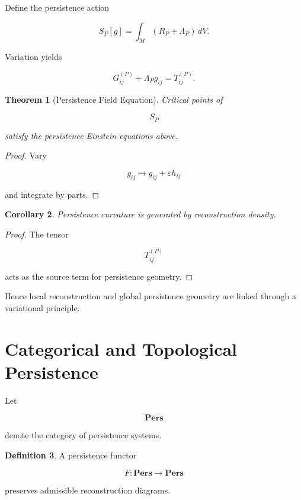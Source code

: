 \documentclass[12pt,oneside]{article}
\newtheorem{theorem}{Theorem}[section] \newtheorem{lemma}[theorem]{Lemma} \newtheorem{proposition}[theorem]{Proposition} \newtheorem{corollary}[theorem]{Corollary}
\theoremstyle{definition}
\newtheorem{definition}[theorem]{Definition} \newtheorem{axiom}[theorem]{Axiom} \newtheorem{remark}[theorem]{Remark} \newtheorem{example}[theorem]{Example}
\begin{document}
Define the persistence action

\[
S_P[g]
=
\int_M
(R_P+\Lambda_P)
\,dV.
\]

Variation yields

\[
G_{ij}^{(P)}
+
\Lambda_P g_{ij}
=
T_{ij}^{(P)}.
\]

\begin{theorem}[Persistence Field Equation]

Critical points of

\[
S_P
\]

satisfy the persistence Einstein equations above.

\end{theorem}

\begin{proof}

Vary

\[
g_{ij}
\mapsto
g_{ij}
+
\varepsilon h_{ij}
\]

and integrate by parts.

\end{proof}

\begin{corollary}

Persistence curvature is generated by reconstruction density.

\end{corollary}

\begin{proof}

The tensor

\[
T_{ij}^{(P)}
\]

acts as the source term for persistence geometry.

\end{proof}

Hence local reconstruction and global persistence geometry are linked through a variational principle.

\section{Categorical and Topological Persistence}

Let

\[
\mathbf{Pers}
\]

denote the category of persistence systems.

\begin{definition}

A persistence functor

\[
F:
\mathbf{Pers}
\rightarrow
\mathbf{Pers}
\]

preserves admissible reconstruction diagrams.

\end{definition}
\end{document}
